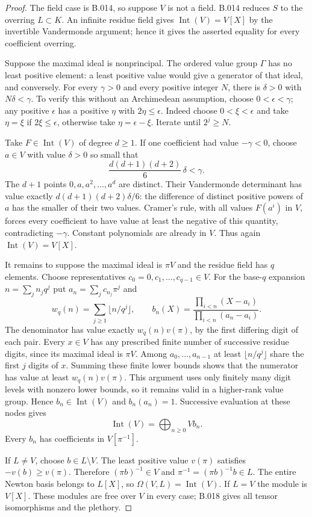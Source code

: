 \begin{proof}
The field case is B.014, so suppose $V$ is not a field.
B.014 reduces $S$ to the overring $L\subset K$.
An infinite residue field gives $\operatorname{Int}(V)=V[X]$
by the invertible Vandermonde argument; hence it gives the
asserted equality for every coefficient overring.

Suppose the maximal ideal is nonprincipal. The ordered value
group $\Gamma$ has no least positive element: a least positive
value would give a generator of that ideal, and conversely.
For every $\gamma>0$ and every positive integer $N$, there is
$\delta>0$ with $N\delta<\gamma$. To verify this without an
Archimedean assumption, choose $0<\epsilon<\gamma$; any positive
$\epsilon$ has a positive $\eta$ with $2\eta\le\epsilon$.
Indeed choose $0<\xi<\epsilon$ and take $\eta=\xi$ if
$2\xi\le\epsilon$, otherwise take $\eta=\epsilon-\xi$.
Iterate until $2^j\ge N$.

Take $F\in\operatorname{Int}(V)$ of degree $d\ge1$. If one
coefficient had value $-\gamma<0$, choose $a\in V$ with value
$\delta>0$ so small that
\[
 \frac{d(d+1)(d+2)}6\,\delta<\gamma.
\]
The $d+1$ points $0,a,a^2,\ldots,a^d$ are distinct. Their
Vandermonde determinant has value exactly
$d(d+1)(d+2)\delta/6$: the difference of distinct positive
powers of $a$ has the smaller of their two values.
Cramer's rule, with all values $F(a^i)$ in $V$, forces every
coefficient to have value at least the negative of this
quantity, contradicting $-\gamma$. Constant polynomials are
already in $V$. Thus again $\operatorname{Int}(V)=V[X]$.

It remains to suppose the maximal ideal is $\pi V$ and the
residue field has $q$ elements. Choose representatives
$c_0=0,c_1,\ldots,c_{q-1}\in V$. For the base-$q$ expansion
$n=\sum_j n_jq^j$ put $a_n=\sum_jc_{n_j}\pi^j$ and
\[
 w_q(n)=\sum_{j\ge1}\lfloor n/q^j\rfloor,\qquad
 b_n(X)=\frac{\prod_{i<n}(X-a_i)}{\prod_{i<n}(a_n-a_i)}.
\]
The denominator has value exactly $w_q(n)v(\pi)$, by the
first differing digit of each pair. Every $x\in V$ has any
prescribed finite number of successive residue digits, since
its maximal ideal is $\pi V$. Among $a_0,\ldots,a_{n-1}$ at
least $\lfloor n/q^j\rfloor$ share the first $j$ digits of
$x$. Summing these finite lower bounds shows that the
numerator has value at least $w_q(n)v(\pi)$.
This argument uses only finitely many digit levels with
nonzero lower bounds, so it remains valid in a higher-rank
value group. Hence $b_n\in\operatorname{Int}(V)$ and
$b_n(a_n)=1$. Successive evaluation at these nodes gives
\[
 \operatorname{Int}(V)=\bigoplus_{n\ge0}Vb_n.
\]
Every $b_n$ has coefficients in $V[\pi^{-1}]$.

If $L\ne V$, choose $b\in L\setminus V$.
The least positive value $v(\pi)$ satisfies
$-v(b)\ge v(\pi)$. Therefore $(\pi b)^{-1}\in V$ and
$\pi^{-1}=(\pi b)^{-1}b\in L$.
The entire Newton basis belongs to $L[X]$, so
$\Omega(V,L)=\operatorname{Int}(V)$. If $L=V$ the module is
$V[X]$. These modules are free over $V$ in every case;
B.018 gives all tensor isomorphisms and the plethory.
\end{proof}


